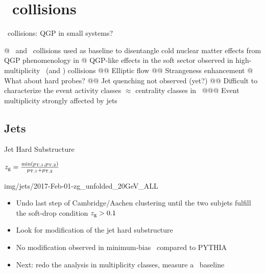 \documentclass[xcolor={usenames,dvipsnames}]{beamer}
\begin{document}
\section{\pPb\ collisions}

\begin{frame}[fragile]{\pPb\ collisions: QGP in small systems?}
\begin{easylist}[itemize]
@ \pPb\ and \pp\ collisions used as baseline to disentangle cold nuclear matter effects from QGP phenomenology in \PbPb
@ QGP-like effects in the soft sector observed in high-multiplicity \pPb\ (and \pp) collisions
@@ Elliptic flow
@@ Strangeness enhancement
@ What about hard probes?
@@ \alert{Jet quenching not observed (yet?)}
@@ Difficult to characterize the event activity classes $\approx$ centrality classes in \PbPb\
@@@ \alert{Event multiplicity strongly affected by jets}
\end{easylist}
\end{frame}

\subsection*{Jets}

\begin{frame}{Jet Hard Substructure}
\begin{center}
$z_{\rm g} = \frac{\min({p_{\rm T,1},p_{\rm T,2}})}{p_{\rm T,1}+p_{\rm T,2}}$ 
\begin{overpic}[width=.9\textwidth, trim=0 0 0 0, clip]{img/jets/2017-Feb-01-zg_unfolded_20GeV_ALL}
\end{overpic}
\end{center}
\vspace{-10pt}
\footnotesize
\begin{itemize}
\item Undo last step of Cambridge/Aachen clustering until the two subjets fulfill the soft-drop condition $z_{\rm g} > 0.1$
\item Look for modification of the jet hard substructure
\item \alert{No modification} observed in minimum-bias \pPb\ compared to PYTHIA
\item Next: redo the analysis in multiplicity classes, measure a \pp\ baseline
\end{itemize}
\end{frame}
\end{document}
